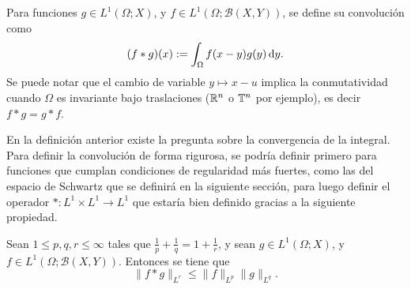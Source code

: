 \begin{definition}[Convoluciones]
    Para funciones $g\in L^1(\Omega;X)$, y $f\in L^1(\Omega; \mathcal{B}(X, Y))$, se define su convolución como 	
    \begin{equation*}
        (f*g)(x) := \int_{\Omega} f(x-y)g(y)\mathop{}\!\mathrm{d} y.
    \end{equation*}
    Se puede notar que el cambio de variable $y\mapsto x-u$ implica la
    conmutatividad cuando $\Omega$ es invariante bajo traslaciones ($\mathbb{R}^n$ o $\mathbb{T}^n$ por ejemplo), es decir $f*g=g*f$.
\end{definition}
\begin{remark}
    En la definición anterior existe la pregunta sobre la convergencia de la
    integral. Para definir la convolución de forma rigurosa, se podría definir 
    primero para funciones que cumplan condiciones de regularidad más 
    fuertes, como las del espacio de Schwartz que se definirá en la siguiente
    sección, para luego definir el operador $*:L^1\times L^1 \rightarrow L^1$
    que estaría bien definido gracias a la siguiente propiedad.
\end{remark}
\begin{proposition}
    Sean $1\leq p,q,r\leq \infty$ tales que $\frac{1}{p} + \frac{1}{q} = 1 + 
    \frac{1}{r}$, y sean $g\in L^1(\Omega;X)$, y $f\in L^1(\Omega; \mathcal{B}(X, Y))$. Entonces se tiene que
    \begin{equation*}
        \|f*g\|_{L^r} \leq \|f\|_{L^p} \|g\|_{L^q}.
    \end{equation*}
\end{proposition}
